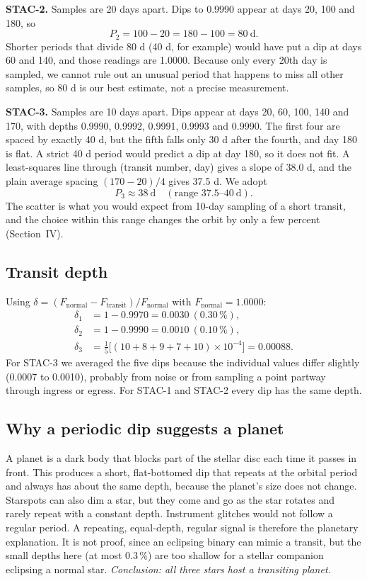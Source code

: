 \documentclass[10pt,twocolumn]{article}
\begin{document}
\textbf{STAC-2.} Samples are 20 days apart. Dips to 0.9990 appear at days 20, 100 and 180, so
\begin{equation}
P_2 = 100-20 = 180-100 = 80\ \text{d}.
\end{equation}
Shorter periods that divide 80 d (40 d, for example) would have put a dip at days 60 and 140, and those readings are 1.0000. Because only every 20th day is sampled, we cannot rule out an unusual period that happens to miss all other samples, so 80 d is our best estimate, not a precise measurement.

\textbf{STAC-3.} Samples are 10 days apart. Dips appear at days 20, 60, 100, 140 and 170, with depths 0.9990, 0.9992, 0.9991, 0.9993 and 0.9990. The first four are spaced by exactly 40 d, but the fifth falls only 30 d after the fourth, and day 180 is flat. A strict 40 d period would predict a dip at day 180, so it does not fit. A least-squares line through (transit number, day) gives a slope of 38.0 d, and the plain average spacing $(170-20)/4$ gives 37.5 d. We adopt
\begin{equation}
P_3\approx 38\ \text{d}\quad(\text{range }37.5\text{--}40\ \text{d}).
\end{equation}
The scatter is what you would expect from 10-day sampling of a short transit, and the choice within this range changes the orbit by only a few percent (Section~IV).

\subsection{Transit depth}
Using $\delta=(F_\text{normal}-F_\text{transit})/F_\text{normal}$ with $F_\text{normal}=1.0000$:
\begin{align}
\delta_1 &= 1-0.9970 = 0.0030\ (0.30\,\%),\\
\delta_2 &= 1-0.9990 = 0.0010\ (0.10\,\%),\\
\delta_3 &= \tfrac{1}{5}\bigl[(10+8+9+7+10)\times10^{-4}\bigr] = 0.00088.
\end{align}
For STAC-3 we averaged the five dips because the individual values differ slightly (0.0007 to 0.0010), probably from noise or from sampling a point partway through ingress or egress. For STAC-1 and STAC-2 every dip has the same depth.

\subsection{Why a periodic dip suggests a planet}
A planet is a dark body that blocks part of the stellar disc each time it passes in front. This produces a short, flat-bottomed dip that repeats at the orbital period and always has about the same depth, because the planet's size does not change. Starspots can also dim a star, but they come and go as the star rotates and rarely repeat with a constant depth. Instrument glitches would not follow a regular period. A repeating, equal-depth, regular signal is therefore the planetary explanation. It is not proof, since an eclipsing binary can mimic a transit, but the small depths here (at most 0.3\,\%) are too shallow for a stellar companion eclipsing a normal star. \emph{Conclusion: all three stars host a transiting planet.}
\end{document}
